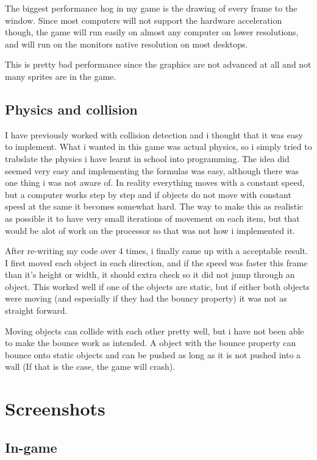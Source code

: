 \documentclass[a4paper,12pt]{article}
\begin{document}
The biggest performance hog in my game is the drawing of every frame to the window.
Since most computers will not support the hardware acceleration though, the game will run easily on almost any computer on lower resolutions, and will run on the monitors native resolution on most desktops.

This is pretty bad performance since the graphics are not advanced at all and not many sprites are in the game.


\subsection{Physics and collision}

I have previously worked with collision detection and i thought that it was easy to implement.
What i wanted in this game was actual physics, so i simply tried to trabslate the physics i have learnt in school into programming.
The idea did seemed very easy and implementing the formulas was easy, although there was one thing i was not aware of.
In reality everything moves with a constant speed, but a computer works step by step and if objects do not move with constant speed at the same it becomes somewhat hard.
The way to make this as realistic as possible it to have very small iterations of movement on each item, but that would be alot of work on the processor so that was not how i implemented it.

After re-writing my code over 4 times, i finally came up with a acceptable result.
I first moved each object in each direction, and if the speed was faster this frame than it's height or width, it should extra check so it did not jump through an object.
This worked well if one of the objects are static, but if either both objects were moving (and especially if they had the bouncy property) it was not as straight forward.

Moving objects can collide with each other pretty well, but i have not been able to make the bounce work as intended.
A object with the bounce property can bounce onto static objects and can be pushed as long as it is not pushed into a wall (If that is the case, the game will crash).


\section{Screenshots}

\subsection{In-game}
\end{document}
